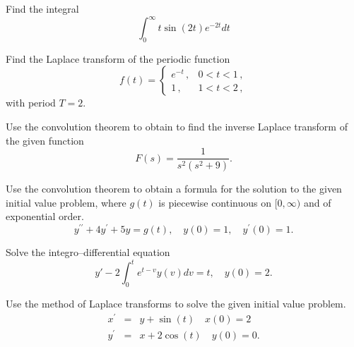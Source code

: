 \documentclass[11pt]{article}
\begin{document}
\makelabtitle


\begin{problem}
Find the integral
\[\int_{0}^{\infty}t\sin (2t) e^{-2t}dt\]
\end{problem}



\begin{problem}
Find the Laplace transform of the periodic function
\[f(t)=\left\{\begin{array}{ll}
        e^{-t}\,, & 0<t<1\,,\\
        1\,, & 1<t<2\,,
       \end{array}\right.
\]
with period $T=2$.
\end{problem}




\begin{problem}
Use the convolution theorem to obtain to find the inverse Laplace transform of the given function
\begin{equation*}
F(s) = \dfrac{1}{s^2 (s^2+9)}.
\end{equation*}
\end{problem}





\begin{problem}
Use the convolution theorem to obtain a formula for the solution to the given initial value problem, where $g(t)$ is piecewise continuous on $[0,\infty)$ and of exponential order.
\begin{equation*}
y^{\prime \prime} + 4y^{\prime} + 5 y = g(t), \quad y(0)=1, \quad y^{\prime}(0)=1.
\end{equation*}
\end{problem}



\begin{problem}
Solve the integro--differential equation
\[y'-2\int_{0}^{t}e^{t-v}y(v)dv=t,\quad y(0)=2.\]
\end{problem}



\begin{problem}
Use the method of Laplace transforms to solve the given initial value problem.
\begin{eqnarray*}
x^{\prime} & = & y + \sin(t) \quad x(0)=2 \\
y^{\prime} & = & x + 2 \cos(t) \quad y(0) = 0 .
\end{eqnarray*}
\end{problem}
\end{document}
